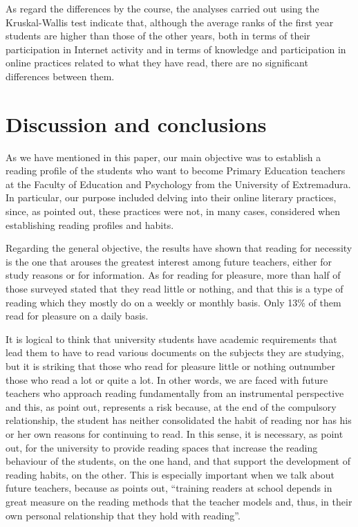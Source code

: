 \documentclass[english]{textolivre}
\begin{document}
As regard the differences by the course, the analyses carried out using the Kruskal-Wallis test indicate that, although the average ranks of the first year students are higher than those of the other years, both in terms of their participation in Internet activity and in terms of knowledge and participation in online practices related to what they have read, there are no significant differences between them. 



\section{Discussion and conclusions}

As we have mentioned in this paper, our main objective was to establish a reading profile of the students who want to become Primary Education teachers at the Faculty of Education and Psychology from the University of Extremadura. In particular, our purpose included delving into their online literary practices, since, as \textcite{ballester_educacion_2016} pointed out, these practices were not, in many cases, considered when establishing reading profiles and habits.  

Regarding the general objective, the results have shown that reading for necessity is the one that arouses the greatest interest among future teachers, either for study reasons or for information. As for reading for pleasure, more than half of those surveyed stated that they read little or nothing, and that this is a type of reading which they mostly do on a weekly or monthly basis. Only 13\% of them read for pleasure on a daily basis. 

It is logical to think that university students have academic requirements that lead them to have to read various documents on the subjects they are studying, but it is striking that those who read for pleasure little or nothing outnumber those who read a lot or quite a lot. In other words, we are faced with future teachers who approach reading fundamentally from an instrumental perspective and this, as \textcite{alcocer_vazquez_practicas_2021} point out, represents a risk because, at the end of the compulsory relationship, the student has neither consolidated the habit of reading nor has his or her own reasons for continuing to read. In this sense, it is necessary, as \textcite{yubero_lectura_2015} point out, for the university to provide reading spaces that increase the reading behaviour of the students, on the one hand, and that support the development of reading habits, on the other. This is especially important when we talk about future teachers, because as \textcite[p.55]{granado_teachers_2014} points out, “training readers at school depends in great measure on the reading methods that the teacher models and, thus, in their own personal relationship that they hold with reading”.
\end{document}
